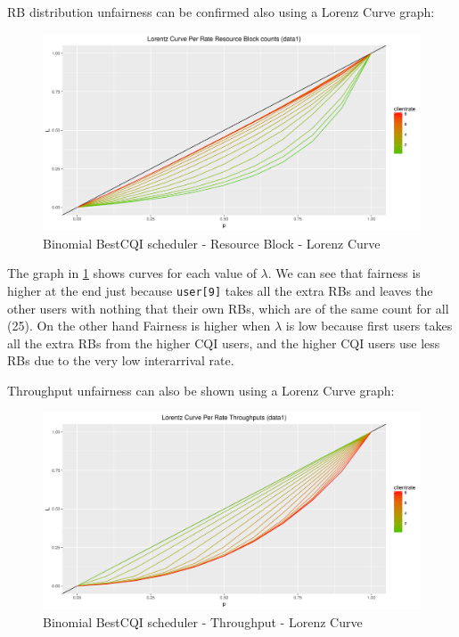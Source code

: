 RB distribution unfairness can be confirmed also using a Lorenz Curve graph:
\begin{figure}[H]
  \includegraphics[width=1\textwidth]{images/lorallrb-binombest.png}
  \caption{Binomial BestCQI scheduler - Resource Block - Lorenz Curve}
  \label{fig:lorallrb-binombest}
\end{figure}
The graph in \ref{fig:lorallrb-binombest} shows curves for each value of \(\lambda\). We can see that fairness is higher at the end just because \texttt{user[9]} takes all the extra RBs and leaves the other users with nothing that their own RBs, which are of the same count for all (25). On the other hand Fairness is higher when \(\lambda\) is low because first users takes all the extra RBs from the higher CQI users, and the higher CQI users use less RBs due to the very low interarrival rate.

Throughput unfairness can also be shown using a Lorenz Curve graph:
\begin{figure}[H]
  \includegraphics[width=1\textwidth]{images/lorallth-binombest.png}
  \caption{Binomial BestCQI scheduler - Throughput - Lorenz Curve}
  \label{fig:lorallth-binombest}
\end{figure}

